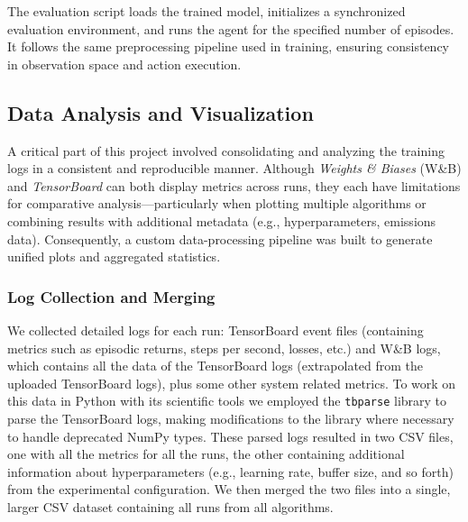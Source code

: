 The evaluation script loads the trained model, initializes a synchronized evaluation environment, and runs the agent for the specified number of episodes. It follows the same preprocessing pipeline used in training, ensuring consistency in observation space and action execution.

\subsection{Data Analysis and Visualization}
\label{subsec:data_analysis}

A critical part of this project involved consolidating and analyzing the training logs in a consistent and reproducible manner. Although \textit{Weights \& Biases} (W\&B) and \textit{TensorBoard} can both display metrics across runs, they each have limitations for comparative analysis—particularly when plotting multiple algorithms or combining results with additional metadata (e.g., hyperparameters, emissions data). Consequently, a custom data-processing pipeline was built to generate unified plots and aggregated statistics.

\subsubsection{Log Collection and Merging}
We collected detailed logs for each run: TensorBoard event files (containing metrics such as episodic returns, steps per second, losses, etc.) and W\&B logs, which contains all the data of the TensorBoard logs (extrapolated from the uploaded TensorBoard logs), plus some other system related metrics. To work on this data in Python with its scientific tools we employed the \texttt{tbparse} library to parse the TensorBoard logs, making modifications to the library where necessary to handle deprecated NumPy types. These parsed logs resulted in two CSV files, one with all the metrics for all the runs, the other containing additional information about hyperparameters (e.g., learning rate, buffer size, and so forth) from the experimental configuration. We then merged the two files into a single, larger CSV dataset containing all runs from all algorithms.


